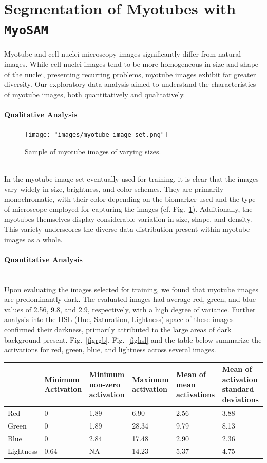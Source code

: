 \section{Segmentation of Myotubes with \texttt{MyoSAM}}\label{secsam}

Myotube and cell nuclei microscopy images significantly differ from natural images. While cell nuclei images tend to be more homogeneous in size and shape of the nuclei, presenting recurring problems, myotube images exhibit far greater diversity. Our exploratory data analysis aimed to understand the characteristics of myotube images, both quantitatively and qualitatively.

\paragraph{Qualitative Analysis}
\begin{figure}
	\centering
	\texttt{[image: "images/myotube\_image\_set.png"]}
	\caption[Sample myotube images]{Sample of myotube images of varying sizes.}
	\label{figsamplemyotubes}
\end{figure}
\ \\
In the myotube image set eventually used for training, it is clear that the images vary widely in size, brightness, and color schemes. They are primarily monochromatic, with their color depending on the biomarker used and the type of microscope employed for capturing the images (cf. Fig.~\ref{figsamplemyotubes}). Additionally, the myotubes themselves display considerable variation in size, shape, and density. This variety underscores the diverse data distribution present within myotube images as a whole.

\paragraph{Quantitative Analysis}
\ \\
Upon evaluating the images selected for training, we found that myotube images are predominantly dark. The evaluated images had average red, green, and blue values of 2.56, 9.8, and 2.9, respectively, with a high degree of variance. Further analysis into the HSL (Hue, Saturation, Lightness) space of these images confirmed their darkness, primarily attributed to the large areas of dark background present. Fig.~\ref{figrgb}, Fig.~\ref{fighsl} and the table below summarize the activations for red, green, blue, and lightness across several images.

\begin{tabular}{|p{2cm}|p{2cm}|p{2cm}|p{2cm}|p{2cm}|p{2cm}|}
	\hline
	& Minimum Activation & Minimum non-zero  activation & Maximum activation & Mean of mean activations & Mean of activation standard deviations \\
	\hline
	Red & 0 & 1.89 & 6.90 & 2.56 & 3.88 \\
	\hline
	Green & 0 & 1.89 & 28.34 & 9.79 & 8.13 \\
	\hline
	Blue & 0 & 2.84 & 17.48 & 2.90 & 2.36 \\
	\hline
	Lightness & 0.64 & NA & 14.23 & 5.37 & 4.75 \\
	\hline
\end{tabular}

